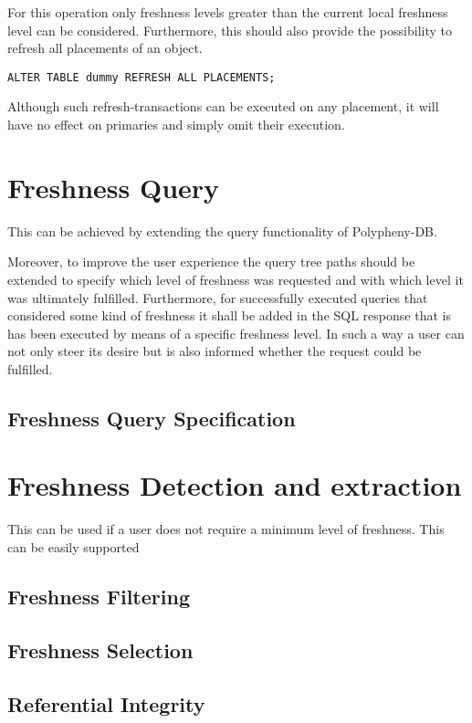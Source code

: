 For this operation only freshness levels greater than the current local freshness level can be considered.
Furthermore, this should also provide the possibility to refresh all placements of an object.
\begin{verbatim}
ALTER TABLE dummy REFRESH ALL PLACEMENTS;
\end{verbatim}

Although such refresh-transactions can be executed on any placement, it will have no effect on primaries and simply omit their execution. 



\section{Freshness Query}
This can be achieved by extending the query functionality of Polypheny-DB.

Moreover, to improve the user experience the query tree paths should be extended to specify which level of freshness was requested and with which level it was 
ultimately fulfilled. Furthermore, for successfully executed queries that considered some kind of freshness it shall be added in the SQL response that is has been 
executed by means of a specific freshness level.
In such a way a user can not only steer its desire but is also informed whether the request could be fulfilled.

\subsection{Freshness Query Specification}

\section{Freshness Detection and extraction}



This can be used if a user does not require a minimum level of freshness. This can be easily supported  


\subsection{Freshness Filtering}


\subsection{Freshness Selection}


\tocless\subsection{Referential Integrity}


